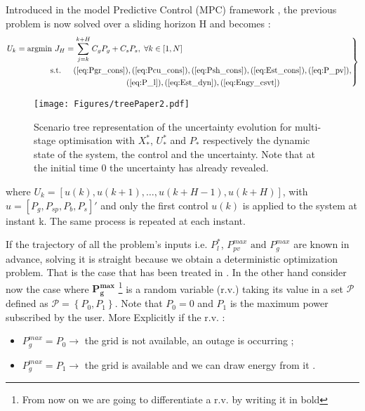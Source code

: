 \documentclass[conference]{IEEEtran}
\begin{document}
Introduced in the model Predictive Control (MPC) framework \cite{ECaCbo2007}, the previous problem is now solved over a sliding horizon H and becomes : 
\begin{equation}\label{eq:MPCsys}
\left. 
\begin{aligned}
&U_k = \text{argmin } J_H = \sum_{j=k}^{k+H} C_gP_g + C_sP_s, \hspace{3px} \forall k \in [1, N] \\
& \text{\hspace{50px} s.t.\hspace{15px}} (\ref{eq:Pgr_cons}),(\ref{eq:Pcu_cons}),(\ref{eq:Psh_cons}), (\ref{eq:Est_cons}),  (\ref{eq:P_pv}),\\
& \text{\hspace{147px}}(\ref{eq:P_l}), (\ref{eq:Est_dyn}),(\ref{eq:Engy_csvt})
\end{aligned}\right \}
\end{equation}

\begin{figure}[!b]
         \centering
    \texttt{[image: Figures/treePaper2.pdf]}
    \caption{Scenario tree representation of the uncertainty evolution for multi-stage optimisation with $X_*^*$, $U_*^*$ and $P_*$ respectively the dynamic state of the system, the control and the uncertainty. Note that at  the initial time 0  the uncertainty has already revealed. 
}
    \label{fig:Snr_tree}
\end{figure}
\noindent where $U_k = [u(k), u(k+1), \ldots,u(k+H-1), u(k+H)]$, with  $u = [ P_g,P_{sp},P_b,P_s]'$ and only the first control $u(k)$ is applied to the system at instant k. The same process is repeated at each instant. 

If the trajectory of all the problem's inputs i.e. $P_l^*$, $P_{pv}^{max}  \text{ and } P_g^{max}$ are known in advance, solving it is straight because we obtain a deterministic optimization problem. 
That is the case that has been treated in \cite{JPrPHa2019}. In the other hand consider now the case where $\textbf{P}_\textbf{g}^{\textbf{max}}$ \footnote{From now on we are going to differentiate  a r.v. by writing it in bold}  is a random variable (r.v.) taking its value in a set $\mathcal{P}$ defined as $ \mathcal{P} = \left \{ P_0 , P_1\right \}$. Note that $P_0=0$ and $P_1$ is the maximum power subscribed by the user. More Explicitly if the r.v. : \begin{itemize}
\item $P_g^{max} = P_0 \rightarrow$ the grid is not available, an outage is occurring ; 
\item $P_g^{max} = P_1 \rightarrow$ the grid is available and we can draw energy from it . 
\end{itemize}
\end{document}
